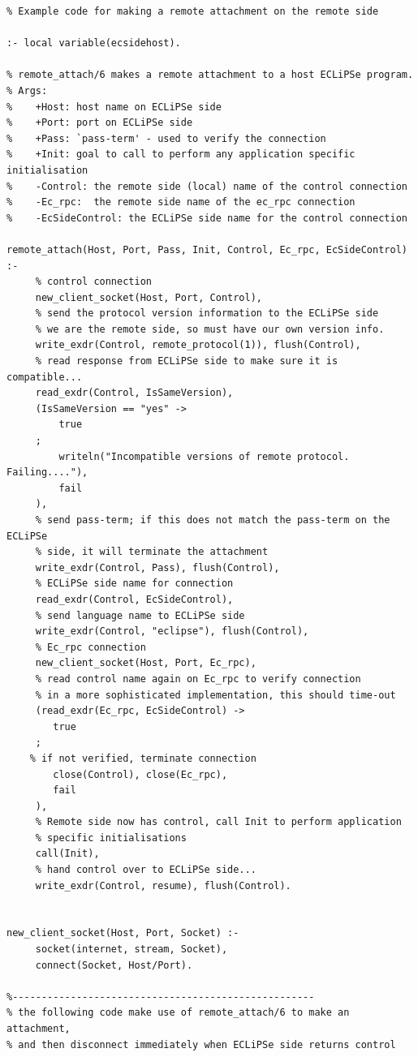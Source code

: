 \begin{verbatim}
% Example code for making a remote attachment on the remote side

:- local variable(ecsidehost).

% remote_attach/6 makes a remote attachment to a host ECLiPSe program.
% Args:
%    +Host: host name on ECLiPSe side
%    +Port: port on ECLiPSe side
%    +Pass: `pass-term' - used to verify the connection
%    +Init: goal to call to perform any application specific initialisation
%    -Control: the remote side (local) name of the control connection
%    -Ec_rpc:  the remote side name of the ec_rpc connection
%    -EcSideControl: the ECLiPSe side name for the control connection

remote_attach(Host, Port, Pass, Init, Control, Ec_rpc, EcSideControl) :-
     % control connection
     new_client_socket(Host, Port, Control),
     % send the protocol version information to the ECLiPSe side
     % we are the remote side, so must have our own version info.
     write_exdr(Control, remote_protocol(1)), flush(Control),
     % read response from ECLiPSe side to make sure it is compatible...
     read_exdr(Control, IsSameVersion),
     (IsSameVersion == "yes" ->
         true 
     ; 
         writeln("Incompatible versions of remote protocol. Failing...."),
         fail
     ),
     % send pass-term; if this does not match the pass-term on the ECLiPSe
     % side, it will terminate the attachment
     write_exdr(Control, Pass), flush(Control),
     % ECLiPSe side name for connection
     read_exdr(Control, EcSideControl),
     % send language name to ECLiPSe side
     write_exdr(Control, "eclipse"), flush(Control),
     % Ec_rpc connection
     new_client_socket(Host, Port, Ec_rpc),
     % read control name again on Ec_rpc to verify connection
     % in a more sophisticated implementation, this should time-out
     (read_exdr(Ec_rpc, EcSideControl) ->
        true 
     ; 
	% if not verified, terminate connection
        close(Control), close(Ec_rpc),
        fail
     ),
     % Remote side now has control, call Init to perform application
     % specific initialisations
     call(Init),
     % hand control over to ECLiPSe side...
     write_exdr(Control, resume), flush(Control).


new_client_socket(Host, Port, Socket) :-
     socket(internet, stream, Socket),
     connect(Socket, Host/Port).

%----------------------------------------------------
% the following code make use of remote_attach/6 to make an attachment,
% and then disconnect immediately when ECLiPSe side returns control


\end{verbatim}
